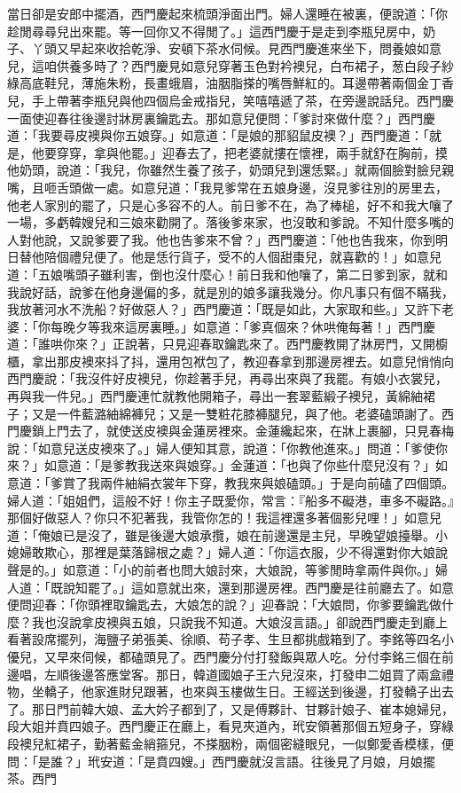 \begin{showcontents}{}
當日卻是安郎中擺酒，西門慶起來梳頭淨面出門。婦人還睡在被裏，便說道：「你趁閒尋尋兒出來罷。等一回你又不得閒了。」這西門慶于是走到李瓶兒房中，奶子、丫頭又早起來收拾乾淨、安頓下茶水伺候。見西門慶進來坐下，問養娘如意兒，這咱供養多時了？西門慶見如意兒穿著玉色對衿襖兒，白布裙子，葱白段子紗綠高底鞋兒，薄施朱粉，長畫蛾眉，油胭脂搽的嘴唇鮮紅的。耳邊帶著兩個金丁香兒，手上帶著李瓶兒與他四個烏金戒指兒，笑嘻嘻遞了茶，在旁邊說話兒。西門慶一面使迎春往後邊討牀房裏鑰匙去。那如意兒便問：「爹討來做什麼？」西門慶道：「我要尋皮襖與你五娘穿。」如意道：「是娘的那貂鼠皮襖？」西門慶道：「就是，他要穿穿，拿與他罷。」迎春去了，把老婆就摟在懷裡，兩手就舒在胸前，摸他奶頭，說道：「我兒，你雖然生養了孩子，奶頭兒到還恁緊。」就兩個臉對臉兒親嘴，且咂舌頭做一處。如意兒道：「我見爹常在五娘身邊，沒見爹往別的房里去，他老人家別的罷了，只是心多容不的人。前日爹不在，為了棒槌，好不和我大嚷了一場，多虧韓嫂兒和三娘來勸開了。落後爹來家，也沒敢和爹說。不知什麼多嘴的人對他說，又說爹要了我。他也告爹來不曾？」西門慶道：「他也告我來，你到明日替他陪個禮兒便了。他是恁行貨子，受不的人個甜棗兒，就喜歡的！」如意兒道：「五娘嘴頭子雖利害，倒也沒什麼心！前日我和他嚷了，第二日爹到家，就和我說好話，說爹在他身邊偏的多，就是別的娘多讓我幾分。你凡事只有個不瞞我，我放著河水不洗船？好做惡人？」西門慶道：「既是如此，大家取和些。」又許下老婆：「你每晚夕等我來這房裏睡。」如意道：「爹真個來？休哄俺每著！」西門慶道：「誰哄你來？」正說著，只見迎春取鑰匙來了。西門慶教開了牀房門，又開櫥櫃，拿出那皮襖來抖了抖，還用包袱包了，教迎春拿到那邊房裡去。如意兒悄悄向西門慶說：「我沒件好皮襖兒，你趁著手兒，再尋出來與了我罷。有娘小衣裳兒，再與我一件兒。」西門慶連忙就教他開箱子，尋出一套翠藍緞子襖兒，黃綿紬裙子；又是一件藍潞紬綿褲兒；又是一雙粧花膝褲腿兒，與了他。老婆磕頭謝了。西門慶鎖上門去了，就使送皮襖與金蓮房裡來。金蓮纔起來，在牀上裹腳，只見春梅說：「如意兒送皮襖來了。」婦人便知其意，說道：「你教他進來。」問道：「爹使你來？」如意道：「是爹教我送來與娘穿。」金蓮道：「也與了你些什麼兒沒有？」如意道：「爹賞了我兩件紬絹衣裳年下穿，教我來與娘磕頭。」于是向前磕了四個頭。婦人道：「姐姐們，這般不好！你主子既愛你，常言：『船多不礙港，車多不礙路。』那個好做惡人？你只不犯著我，我管你怎的！我這裡還多著個影兒哩！」如意兒道：「俺娘已是沒了，雖是後邊大娘承攬，娘在前邊還是主兒，早晚望娘擡舉。小媳婦敢欺心，那裡是葉落歸根之處？」婦人道：「你這衣服，少不得還對你大娘說聲是的。」如意道：「小的前者也問大娘討來，大娘說，等爹閒時拿兩件與你。」婦人道：「既說知罷了。」這如意就出來，還到那邊房裡。西門慶是往前廳去了。如意便問迎春：「你頭裡取鑰匙去，大娘怎的說？」迎春說：「大娘問，你爹要鑰匙做什麼？我也沒說拿皮襖與五娘，只說我不知道。大娘沒言語。」卻說西門慶走到廳上看著設席擺列，海鹽子弟張美、徐順、苟子孝、生旦都挑戲箱到了。李銘等四名小優兒，又早來伺候，都磕頭見了。西門慶分付打發飯與眾人吃。分付李銘三個在前邊唱，左順後邊答應堂客。那日，韓道國娘子王六兒沒來，打發申二姐買了兩盒禮物，坐轎子，他家進財兒跟著，也來與玉樓做生日。王經送到後邊，打發轎子出去了。那日門前韓大娘、孟大妗子都到了，又是傅夥計、甘夥計娘子、崔本媳婦兒，段大姐并賁四娘子。西門慶正在廳上，看見夾道內，玳安領著那個五短身子，穿綠段襖兒紅裙子，勤著藍金綃箍兒，不搽胭粉，兩個密縫眼兒，一似鄭愛香模樣，便問：「是誰？」玳安道：「是賁四嫂。」西門慶就沒言語。往後見了月娘，月娘擺茶。西門
\end{showcontents}
